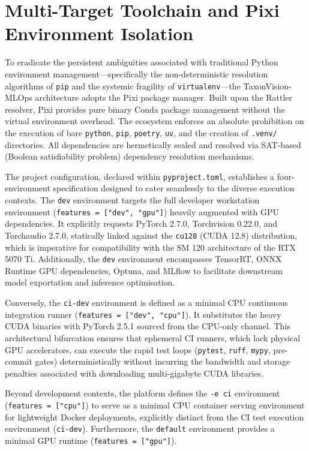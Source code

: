 \section{Multi-Target Toolchain and Pixi Environment Isolation}
\label{sec:multi_target_toolchain}

To eradicate the persistent ambiguities associated with traditional Python environment management—specifically the non-deterministic resolution algorithms of \texttt{pip} and the systemic fragility of \texttt{virtualenv}—the TaxonVision-MLOps architecture adopts the Pixi package manager. Built upon the Rattler resolver, Pixi provides pure binary Conda package management without the virtual environment overhead. The ecosystem enforces an absolute prohibition on the execution of bare \texttt{python}, \texttt{pip}, \texttt{poetry}, \texttt{uv}, and the creation of \texttt{.venv/} directories. All dependencies are hermetically sealed and resolved via SAT-based (Boolean satisfiability problem) dependency resolution mechanisms.

The project configuration, declared within \texttt{pyproject.toml}, establishes a four-environment specification designed to cater seamlessly to the diverse execution contexts. The \texttt{dev} environment targets the full developer workstation environment (\texttt{features = ["dev", "gpu"]}) heavily augmented with GPU dependencies. It explicitly requests PyTorch 2.7.0, Torchvision 0.22.0, and Torchaudio 2.7.0, statically linked against the \texttt{cu128} (CUDA 12.8) distribution, which is imperative for compatibility with the SM 120 architecture of the RTX 5070 Ti. Additionally, the \texttt{dev} environment encompasses TensorRT, ONNX Runtime GPU dependencies, Optuna, and MLflow to facilitate downstream model exportation and inference optimisation.

Conversely, the \texttt{ci-dev} environment is defined as a minimal CPU continuous integration runner (\texttt{features = ["dev", "cpu"]}). It substitutes the heavy CUDA binaries with PyTorch 2.5.1 sourced from the CPU-only channel. This architectural bifurcation ensures that ephemeral CI runners, which lack physical GPU accelerators, can execute the rapid test loops (\texttt{pytest}, \texttt{ruff}, \texttt{mypy}, pre-commit gates) deterministically without incurring the bandwidth and storage penalties associated with downloading multi-gigabyte CUDA libraries.

Beyond development contexts, the platform defines the \texttt{-e ci} environment (\texttt{features = ["cpu"]}) to serve as a minimal CPU container serving environment for lightweight Docker deployments, explicitly distinct from the CI test execution environment (\texttt{ci-dev}). Furthermore, the \texttt{default} environment provides a minimal GPU runtime (\texttt{features = ["gpu"]}).


